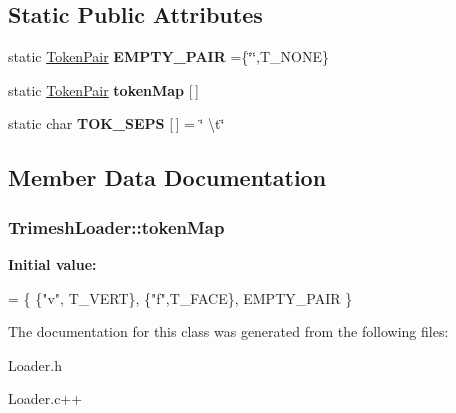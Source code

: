 \subsection*{Static Public Attributes}
\begin{DoxyCompactItemize}
\item 
\hypertarget{classTrimeshLoader_afbfd2f0835786c1a96423ebfe047d68a}{static \hyperlink{structTokenPair}{Token\-Pair} {\bfseries E\-M\-P\-T\-Y\-\_\-\-P\-A\-I\-R} =\{\char`\"{}\char`\"{},T\-\_\-\-N\-O\-N\-E\}}\label{classTrimeshLoader_afbfd2f0835786c1a96423ebfe047d68a}

\item 
static \hyperlink{structTokenPair}{Token\-Pair} {\bfseries token\-Map} \mbox{[}$\,$\mbox{]}
\item 
\hypertarget{classTrimeshLoader_a1ad0bd375daefe6b0989d0393a2bd516}{static char {\bfseries T\-O\-K\-\_\-\-S\-E\-P\-S} \mbox{[}$\,$\mbox{]} = \char`\"{} \textbackslash{}t\char`\"{}}\label{classTrimeshLoader_a1ad0bd375daefe6b0989d0393a2bd516}

\end{DoxyCompactItemize}


\subsection{Member Data Documentation}
\hypertarget{classTrimeshLoader_acc3b92a5900000c950c6aee14bea3569}{
\subsubsection[{token\-Map}]{ Trimesh\-Loader\-::token\-Map\hspace{0.3cm}{\ttfamily [static]}}}\label{classTrimeshLoader_acc3b92a5900000c950c6aee14bea3569}
{\bfseries Initial value\-:}
\begin{DoxyCode}
= \{ 
    \{\textcolor{stringliteral}{"v"}, T\_VERT\}, \{\textcolor{stringliteral}{"f"},T\_FACE\}, 
    EMPTY\_PAIR  
\}
\end{DoxyCode}


The documentation for this class was generated from the following files\-:\begin{DoxyCompactItemize}
\item 
Loader.\-h\item 
Loader.\-c++\end{DoxyCompactItemize}
